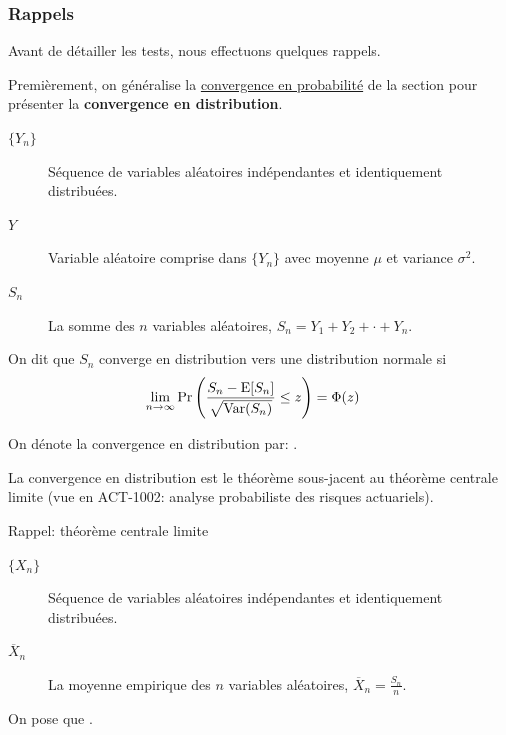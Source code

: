 \documentclass[french]{article}
\begin{document}
\begin{multicols*}{2}
\subsubsection{Rappels}\label{subsubsec:MeanTestsRappels}
Avant de détailler les tests, nous effectuons quelques rappels.

\bigskip

Premièrement, on généralise la \hyperlink{converge-prob}{convergence en probabilité} de la section \underline{\textit{}} pour présenter la \textbf{convergence en distribution}.

\begin{definitionNOHFILL}
\begin{distributions}[Notation]
\begin{description}
	\item[$\{Y_{n}\}$]	Séquence de variables aléatoires indépendantes et identiquement distribuées.
	\item[$Y$]	Variable aléatoire comprise dans $\{Y_{n}\}$ avec moyenne $\mu$ et variance $	\sigma^{2}$.
	\item[$S_{n}$]	La somme des $n$ variables aléatoires, $S_{n} = Y_{1} + Y_{2} + \cdot + Y_{n}$.
\end{description}
\end{distributions}

On dit que $S_{n}$ converge en distribution vers une distribution normale si
\begin{align*}
	\underset{n \rightarrow \infty}{\lim} \Pr\left(\frac{S_{n}	-	\text{E}[S_{n}]}{\sqrt{\text{Var}(S_{n})}}	\leq	z\right)	
	&=	\Phi(z)
\end{align*}

On dénote la convergence en distribution par: .
\end{definitionNOHFILL}

La convergence en distribution est le théorème sous-jacent au théorème centrale limite (vue en ACT-1002: analyse probabiliste des risques actuariels).

\begin{rappel}{\hypertarget{TCLDef}{Rappel: théorème centrale limite}}
\begin{distributions}[Notation]
\begin{description}
	\item[$\{X_{n}\}$]	Séquence de variables aléatoires indépendantes et identiquement distribuées.
	\item[$\overline{X}_{n}$]	La moyenne empirique des $n$ variables aléatoires, $\overline{X}_{n} = \frac{S_{n}}{n}$.
\end{description}
\end{distributions}
On pose que .
\end{rappel}


\end{multicols*}
\end{document}
